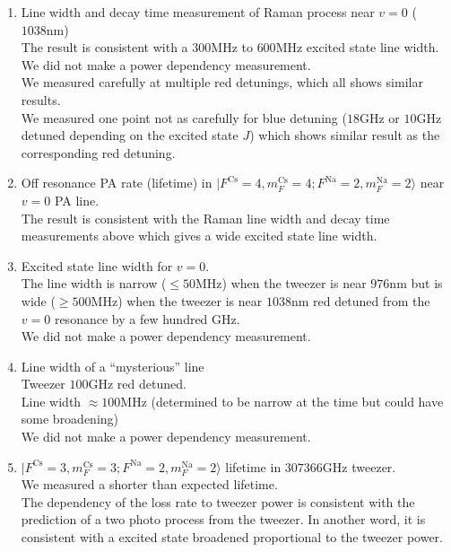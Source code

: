 \documentclass[10pt,fleqn]{article}
\begin{document}
\begin{enumerate}
\item Line width and decay time measurement of Raman process near $v=0$ ($1038 \mathrm{nm}$)\\
  The result is consistent with a $300 \mathrm{MHz}$ to $600 \mathrm{MHz}$
  excited state line width.\\
  We did not make a power dependency measurement.\\
  We measured carefully at multiple red detunings, which all shows similar results.\\
  We measured one point not as carefully for blue detuning
  ($18 \mathrm{GHz}$ or $10 \mathrm{GHz}$ detuned depending on the excited state $J$)
  which shows similar result as the corresponding red detuning.
\item Off resonance PA rate (lifetime) in $|F^{\mathrm{Cs}}\!=\!4, m_{F}^{\mathrm{Cs}}\!=\!4; F^{\mathrm{Na}}\!=\!2, m_{F}^{\mathrm{Na}}\!=\!2\rangle$
  near $v=0$ PA line.\\
  The result is consistent with the Raman line width and decay time measurements above
  which gives a wide excited state line width.
\item Excited state line width for $v=0$.\\
  The line width is narrow ($\leqslant 50 \mathrm{MHz}$)
  when the tweezer is near $976 \mathrm{nm}$ but is wide ($\geqslant 500 \textrm{MHz}$)
  when the tweezer is near $1038 \mathrm{nm}$ red detuned from the $v=0$ resonance
  by a few hundred GHz.\\
  We did not make a power dependency measurement.
\item Line width of a ``mysterious'' line\\
  Tweezer $100 \mathrm{GHz}$ red detuned.\\
  Line width $\approx 100 \mathrm{MHz}$
  (determined to be narrow at the time but could have some broadening)\\
  We did not make a power dependency measurement.
\item $|F^{\mathrm{Cs}}\!=\!3, m_{F}^{\mathrm{Cs}}\!=\!3; F^{\mathrm{Na}}\!=\!2, m_{F}^{\mathrm{Na}}\!=\!2\rangle$ lifetime
  in $307366 \mathrm{GHz}$ tweezer.\\
  We measured a shorter than expected lifetime.\\
  The dependency of the loss rate to tweezer power is consistent with the prediction of
  a two photo process from the tweezer. In another word, it is consistent with
  a excited state broadened proportional to the tweezer power.

\end{enumerate}
\end{document}
